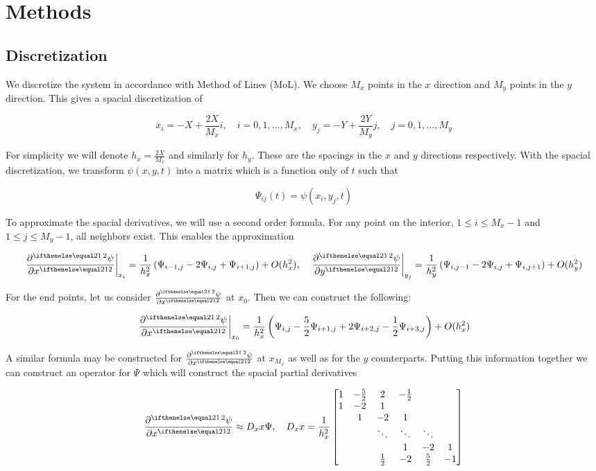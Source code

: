 \documentclass{article}
\begin{document}
\section{Methods}

\subsection{Discretization}

We discretize the system in accordance with Method of Lines (MoL).  We choose
$M_x$ points in the $x$ direction and $M_y$ points in the $y$ direction.
This gives a spacial discretization of

$$x_i = -X + \frac{2X}{M_x}i, \quad i = 0, 1, ..., M_x, \quad
y_j = -Y + \frac{2Y}{M_y}j, \quad j = 0, 1, ..., M_y$$

For simplicity we will denote $h_x = \frac{2X}{M_x}$ and similarly for $h_y$.
These are the spacings in the $x$ and $y$ directions respectively.
With the spacial discretization, we transform $\psi(x,y,t)$ into a matrix
which is a function only of $t$ such that

$$\Psi_{ij}(t) = \psi(x_i,y_j,t)$$

To approximate the spacial derivatives, we will use a second order formula.
For any point on the interior, $1 \leq i \leq M_x - 1$
and $1 \leq j \leq M_y - 1$, all neighbors exist.
This enables the approximation

$$\left.\pder[2]{\psi}{x}\right|_{x_i} =
\frac{1}{h_x^2} \left(\Psi_{i-1,j} - 2 \Psi_{i,j} + \Psi_{i+1,j}\right)
+ O(h_x^2), \quad
\left.\pder[2]{\psi}{y}\right|_{y_j} = \frac{1}{h_y^2}
\left(\Psi_{i,j-1} - 2 \Psi_{i,j} + \Psi_{i,j+1}\right) + O(h_y^2)$$

For the end points, let us consider $\pder[2]{\psi}{x}$ at $x_0$.
Then we can construct the following:

$$\left.\pder[2]{\psi}{x}\right|_{x_0} =
\frac{1}{h_x^2}\left(
\Psi_{i,j} - \frac{5}{2} \Psi_{i+1,j} +
2 \Psi_{i+2,j} - \frac{1}{2} \Psi_{i+3,j}\right) + O(h_x^2)$$

A similar formula may be constructed for $\pder[2]{\psi}{x}$ at $x_{M_x}$
as well as for the $y$ counterparts.  Putting this information together
we can construct an operator for $\Psi$ which will construct the spacial partial
derivatives

\begin{equation}
  \label{eq:differentiation-matrix}
  \pder[2]{\psi}{x} \approx D_xx \Psi, \quad D_xx = \frac{1}{h_x^2}
  \begin{bmatrix}
  1 & -\frac{5}{2} & 2 & -\frac{1}{2} \\
  1 & -2 & 1 \\
  & 1 & -2 & 1 \\
  & & \ddots & \ddots & \ddots \\
  & & & 1 & -2 & 1 \\
  & & \frac{1}{2} & -2 & \frac{5}{2} & -1 \end{bmatrix}
\end{equation}
\end{document}
